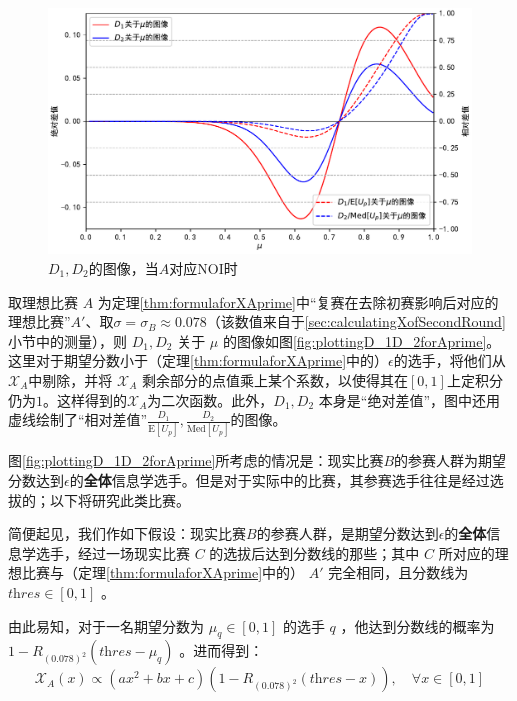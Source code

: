             \begin{figure}[htbp]
                \centering
                \includegraphics[width=\textwidth]{fig/plottingNoiD_1D_2.pdf}
                \caption{$D_1,D_2$的图像，当$A$对应NOI时}
                \label{fig:plottingD_1D_2forNoi}
            \end{figure}

            取理想比赛 $A$ 为定理\ref{thm:formulaforXAprime}中“复赛在去除初赛影响后对应的理想比赛”$A'$、取$\sigma=\sigma_B\approx 0.078$（该数值来自于\ref{sec:calculatingXofSecondRound}小节中的测量），则 $D_1,D_2$ 关于 $\mu$ 的图像如图\ref{fig:plottingD_1D_2forAprime}。这里对于期望分数小于（定理\ref{thm:formulaforXAprime}中的）$\epsilon$的选手，将他们从$\mathcal{X}_A$中剔除，并将 $\mathcal{X}_A$ 剩余部分的点值乘上某个系数，以使得其在$[0,1]$上定积分仍为$1$。这样得到的$\mathcal{X}_A$为二次函数。此外，$D_1,D_2$ 本身是“绝对差值”，图中还用虚线绘制了“相对差值”$\frac{D_1}{\mathrm{E}\left[U_p\right]},\frac{D_2}{\mathrm{Med}\left[U_p\right]}$的图像。

            \vspace{1.5ex}

            图\ref{fig:plottingD_1D_2forAprime}所考虑的情况是：现实比赛$B$的参赛人群为期望分数达到$\epsilon$的\textbf{全体}信息学选手。但是对于实际中的比赛，其参赛选手往往是经过选拔的；以下将研究此类比赛。

            简便起见，我们作如下假设：现实比赛$B$的参赛人群，是期望分数达到$\epsilon$的\textbf{全体}信息学选手，经过一场现实比赛 $C$ 的选拔后达到分数线的那些；其中 $C$ 所对应的理想比赛与（定理\ref{thm:formulaforXAprime}中的） $A'$ 完全相同，且分数线为 $\textit{thres}\in[0,1]$ 。

            由此易知，对于一名期望分数为 $\mu_q\in [0,1]$ 的选手 $q$ ，他达到分数线的概率为 $1-R_{(0.078)^2}(\textit{thres}-\mu_q)$ 。进而得到：
            $$
            \mathcal{X}_A(x)\propto (ax^2+bx+c)\left(1-R_{(0.078)^2}(\textit{thres}-x)\right),\quad\forall x\in [0,1]
            $$

